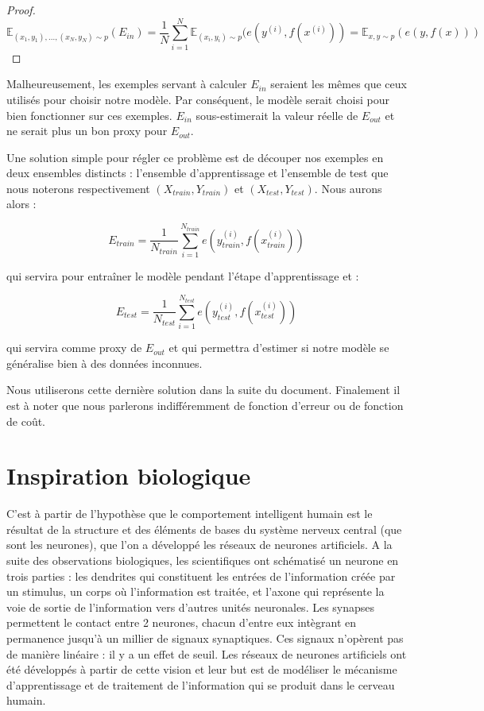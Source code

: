 \begin{proof}
$$
\mathbb{E}_{(x_1, y_1),..., (x_N, y_N) \sim p}(E_{in}) = \frac{1}{N}\sum_{i=1}^{N}{\mathbb{E}_{(x_i, y_i) \sim p}(e(y^{(i)}, f(x^{(i)}))} = \mathbb{E}_{x, y \sim p}(e(y, f(x)))
$$
\end{proof}

Malheureusement, les exemples servant à calculer $E_{in}$ seraient les mêmes que ceux utilisés pour choisir notre modèle. Par conséquent, le modèle serait choisi pour bien fonctionner sur ces exemples. $E_{in}$ sous-estimerait la valeur réelle de $E_{out}$ et ne serait plus un bon proxy pour $E_{out}$.

Une solution simple pour régler ce problème est de découper nos exemples en deux ensembles distincts : l'ensemble d'apprentissage et l'ensemble de test que nous noterons respectivement $(X_{train}, Y_{train})$ et $(X_{test}, Y_{test})$. Nous aurons alors :

\begin{equation}
E_{train} = \frac{1}{N_{train}}\sum_{i=1}^{N_{train}}{e(y^{(i)}_{train}, f(x^{(i)}_{train}))}
\end{equation}

qui servira pour entraîner le modèle pendant l'étape d'apprentissage et :

\begin{equation}
E_{test} = \frac{1}{N_{test}}\sum_{i=1}^{N_{test}}{e(y^{(i)}_{test}, f(x^{(i)}_{test}))}
\end{equation}

qui servira comme proxy de $E_{out}$ et qui permettra d'estimer si notre modèle se généralise bien à des données inconnues.

Nous utiliserons cette dernière solution dans la suite du document. Finalement il est à noter que nous parlerons indifféremment de fonction d'erreur ou de fonction de coût.

\section{Inspiration biologique}
C'est à partir de l'hypothèse que le comportement intelligent humain est le résultat de la structure et des éléments de bases du système nerveux central (que sont les neurones), que l’on a développé les réseaux de neurones artificiels. A la suite des observations biologiques, les scientifiques ont schématisé un neurone en trois parties : les dendrites qui constituent les entrées de l’information créée par un stimulus, un corps où l’information est traitée, et l’axone qui représente la voie de sortie de l’information vers d’autres unités neuronales. Les synapses permettent le contact entre 2 neurones, chacun d'entre eux intègrant en permanence jusqu'à un millier de signaux synaptiques. Ces signaux n'opèrent pas de manière linéaire : il y a un effet de seuil. 
Les réseaux de neurones artificiels ont été développés à partir de cette vision et leur but est de modéliser le mécanisme d'apprentissage et de traitement de l'information qui se produit dans le cerveau humain.

